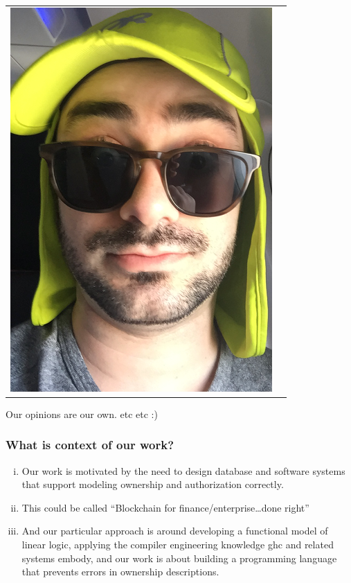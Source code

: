 \documentclass[11pt,reqno]{beamer}
\begin{document}
\begin{frame}
\begin{centering}
\begin{tabular}{l|r}
  \includegraphics[scale=0.22]{../joelpics/IMG_4133.png}
\end{tabular}
\end{centering}

Our opinions are our own. etc etc :)
\end{frame}

\begin{frame}\frametitle{What is context of our work?}
\begin{enumerate}[(i)]
  \item Our work is motivated by the need to design database and software systems
  that support modeling ownership and authorization correctly.
  \item This could be called ``Blockchain for finance/enterprise\ldots done right''
  \item And our particular approach is around developing a functional model
  of linear logic, applying the compiler engineering knowledge ghc and related
  systems embody, and our work is about building a programming language
  that prevents errors in ownership descriptions.
\end{enumerate}

\end{frame}
\end{document}
